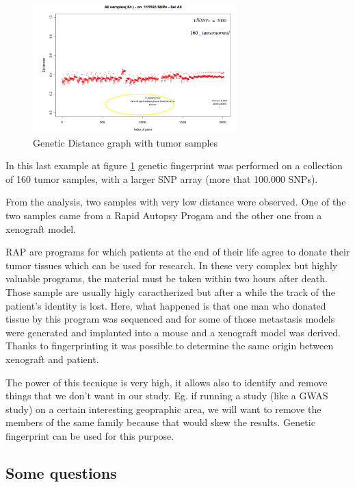 \begin{figure}
	\centering
	\includegraphics[width=0.7\textwidth]{loci3.PNG}
	\caption{\label{fig:Distance3}Genetic Distance graph with tumor samples}
\end{figure}

\bigskip
In this last example at figure \ref{fig:Distance3} genetic fingerprint was performed on a collection of 160  tumor samples, with a larger SNP array (more that 100.000 SNPs).  

From the analysis, two samples with very low distance were observed. One of the two samples came from a 
Rapid Autopsy Progam and the other one from a xenograft model. 

RAP are programs for which patients at the end of their life agree to donate their tumor tissues which can be used for research. In these very complex but highly valuable programs, the material must be taken within two hours after death. Those sample are usually higly caractherized but after a while the track of the patient's identity is lost. 
Here, what happened is that one man who donated tissue by this program was sequenced and for some of those metastasis models were generated and implanted into a mouse and a xenograft model was derived. Thanks to fingerprinting it was possible to determine the same origin between xenograft and patient. 

The power of this tecnique is very high, it allows also to identify and remove things that we don't want in our study. Eg. if running a study (like a GWAS study) on a certain interesting geopraphic area, we will want to remove the members of the same family because that would skew the results. Genetic fingerprint can be used for this purpose.

\subsection{Some questions}

